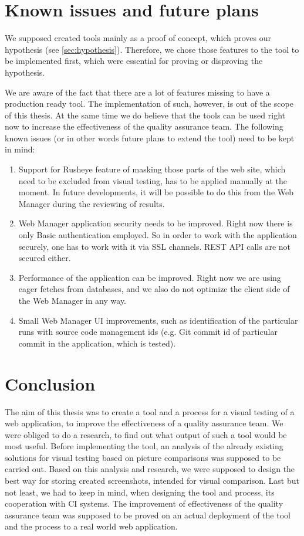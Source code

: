 \documentclass[11pt,oneside,final]{fithesis2}
\begin{document}
\chapter{Known issues and future plans}
We supposed created tools mainly as a proof of concept, which proves our hypothesis (see \ref{sec:hypothesis}). Therefore, we chose those features
to the tool to be implemented first, which were essential for proving or disproving the hypothesis.

We are aware of the fact that there are a lot of features missing to have a production ready tool. The implementation of such, however, is out
of the scope of this thesis. At the same time we do believe that the tools can be used right now to increase the effectiveness of the quality assurance
team. The following known issues (or in other words future plans to extend the tool) need to be kept in mind:

\begin{enumerate}
 \item Support for Rusheye feature of masking those parts of the web site, which need to be excluded from visual testing, has to be applied
 manually at the moment. In future developments, it will be possible to do this from the Web Manager during the reviewing of results.
 \item Web Manager application security needs to be improved. Right now there is only Basic authentication employed. So in order to work
 with the application securely, one has to work with it via SSL channels. REST API calls are not secured either.
 \item Performance of the application can be improved. Right now we are using eager fetches from databases, and we also do not optimize
 the client side of the Web Manager in any way.
 \item Small Web Manager UI improvements, such as identification of the particular runs with source code management ids (e.g. Git commit id of
 particular commit in the application, which is tested).
\end{enumerate}


\label{sec:plannedExtensions}
  
\chapter{Conclusion}
The aim of this thesis was to create a tool and a process for a visual testing of a web application, to improve the effectiveness of a 
quality assurance team. We were obliged to do a research, to find out what output of such a tool would be most useful. Before implementing
the tool, an analysis of the already existing solutions for visual testing based on picture comparisons was supposed to be carried out.
Based on this analysis and research, we were supposed to design the best way for storing created screenshots, intended for visual comparison.
Last but not least, we had to keep in mind, when designing the tool and process, its cooperation with CI systems.
The improvement of effectiveness of the quality assurance team was supposed to be proved on an actual deployment of the tool and the 
process to a real world web application.
\end{document}
